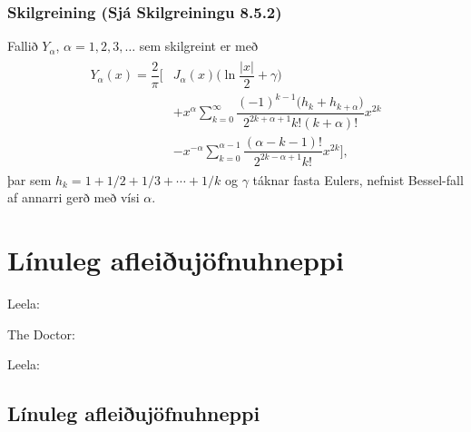 \documentclass[a4paper,10pt,icelandic]{sphinxmanual}
\begin{document}
\subsection{Skilgreining (Sjá Skilgreiningu 8.5.2)}
\label{\detokenize{Kafli08:skilgreining-sja-skilgreiningu-8-5-2}}
Fallið \(Y_{\alpha}\), \({\alpha}=1,2,3,\dots\) sem skilgreint er með
\begin{equation*}
\begin{split}\begin{aligned}
Y_{\alpha}(x)=\dfrac 2{\pi}\bigg[&
J_{\alpha}(x)\bigg(\ln \dfrac {|x|}2+{\gamma}\bigg)\\
&+x^{\alpha}\sum\limits_{k=0}^{\infty}
\dfrac{(-1)^{k-1}\big(h_k+h_{k+\alpha}\big)}
{2^{2k+\alpha+1}k!(k+{\alpha})!} x^{2k}\\
&-x^{-\alpha}\sum\limits_{k=0}^{\alpha-1}
\dfrac{(\alpha-k-1)!}{2^{2k-\alpha+1}k!}x^{2k}\bigg],\end{aligned}\end{split}
\end{equation*}
þar sem \(h_k=1+1/2+1/3+\cdots+1/k\) og \({\gamma}\) táknar fasta Eulers, nefnist Bessel-fall af annarri gerð með vísi \({\alpha}\).


\chapter{Línuleg afleiðujöfnuhneppi}
\label{\detokenize{Kafli09:linuleg-afleiujofnuhneppi}}\label{\detokenize{Kafli09::doc}}
Leela: 

The Doctor: 

Leela: 


\section{Línuleg afleiðujöfnuhneppi}
\label{\detokenize{Kafli09:id1}}
\end{document}

